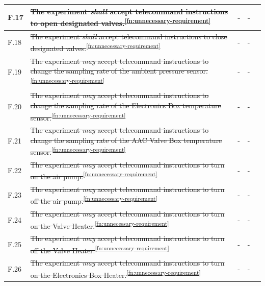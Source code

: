 \documentclass[a4paper,12pt,twoside]{article}
\begin{document}
\begin{longtable}[]{|m{}| m{} |m{} |m{}|m{}|}
F.17 & \st{The experiment \textit{shall} accept telecommand instructions to open designated valves.}\textsuperscript{\ref{fn:unnecessary-requirement}} &- &- & \\ \hline
F.18 & \st{The experiment \textit{shall} accept telecommand instructions to close designated valves.}\textsuperscript{\ref{fn:unnecessary-requirement}} &- &- & \\ \hline
F.19 & \st{The experiment \textit{may} accept telecommand instructions to change the sampling rate of the ambient pressure sensor.}\textsuperscript{\ref{fn:unnecessary-requirement}} &- &- & \\ \hline
F.20 & \st{The experiment \textit{may} accept telecommand instructions to change the sampling rate of the Electronics Box temperature sensor.}\textsuperscript{\ref{fn:unnecessary-requirement}} &- &- & \\ \hline
F.21 & \st{The experiment \textit{may} accept telecommand instructions to change the sampling rate of the AAC Valve Box temperature sensor.}\textsuperscript{\ref{fn:unnecessary-requirement}}& -&-&\\ \hline
F.22 & \st{The experiment \textit{may} accept telecommand instructions to turn on the air pump.}\textsuperscript{\ref{fn:unnecessary-requirement}}                                                                                              &      -        & -            &        \\ \hline
F.23 & \st{The experiment \textit{may} accept telecommand instructions to turn off the air pump.}\textsuperscript{\ref{fn:unnecessary-requirement}}                                                                                             &      -       & -            &        \\ \hline
F.24 & \st{The experiment \textit{may} accept telecommand instructions to turn on the Valve Heater.}\textsuperscript{\ref{fn:unnecessary-requirement}}                                                                                          &      -        & -            &        \\ \hline
F.25 & \st{The experiment \textit{may} accept telecommand instructions to turn off the Valve Heater.}\textsuperscript{\ref{fn:unnecessary-requirement}}                                                                                         &      -        & -            &        \\ \hline
F.26 & \st{The experiment \textit{may} accept telecommand instructions to turn on the Electronics Box Heater.}\textsuperscript{\ref{fn:unnecessary-requirement}}                                                                                     &      -        & -            &        \\ \hline

\end{longtable}
\end{document}
